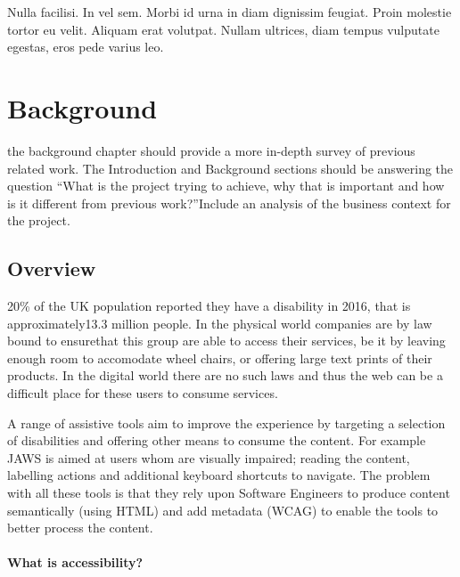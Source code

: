 \begin{savequote}[75mm]
Nulla facilisi. In vel sem. Morbi id urna in diam dignissim feugiat. Proin molestie tortor eu velit. Aliquam erat volutpat. Nullam ultrices, diam tempus vulputate egestas, eros pede varius leo.
\end{savequote}

\chapter{Background}

the background chapter should provide a more in-depth survey of previous
related work.
The Introduction and Background sections should be answering the question
“What is the project trying to achieve, why that is important and how is it
different from previous work?”Include an analysis of the business context for
the project.


\section{Overview}
20\% of the UK population reported they have a disability in 2016, that is
approximately13.3 million people. In the physical world companies are by law
bound to ensurethat this group are able to access their services, be it by
leaving enough room to accomodate wheel chairs, or offering large text prints
of their products. In the digital world there are no such laws and thus the web can be a
difficult place for these users to consume services.

A range of assistive
tools aim to improve the experience by targeting a selection of
disabilities and offering other means to consume the content. For example
JAWS is aimed at users whom are visually impaired; reading the content,
labelling actions and additional keyboard shortcuts to navigate. The problem
with all these tools is that they rely upon Software Engineers to produce
content semantically (using HTML) and add metadata (WCAG) to enable the tools
to better process the content.

\subsubsection{What is accessibility?}

